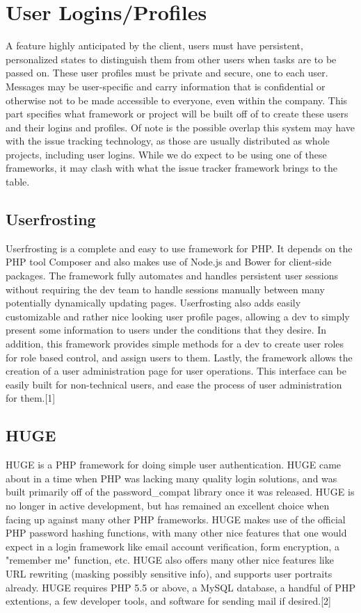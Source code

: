 \documentclass[onecolumn, draftclsnofoot,10pt, compsoc]{IEEEtran}
\begin{document}

\section{User Logins/Profiles}
A feature highly anticipated by the client, users must have persistent, personalized states to distinguish them from other users when tasks are to be 
passed on. These user profiles must be private and secure, one to each user. Messages may be user-specific and carry information that is confidential 
or otherwise not to be made accessible to everyone, even within the company. This part specifies what framework or project will be built off of to 
create these users and their logins and profiles. Of note is the possible overlap this system may have with the issue tracking technology, as those are 
usually distributed as whole projects, including user logins. While we do expect to be using one of these frameworks, it may clash with what the issue tracker 
framework brings to the table.
\subsection{Userfrosting}
Userfrosting is a complete and easy to use framework for PHP. It depends on the PHP tool Composer and also makes use of Node.js and Bower for client-side packages.
The framework fully automates and handles persistent user sessions without requiring the dev team to handle sessions manually between many potentially dynamically updating 
pages. Userfrosting also adds easily customizable and rather nice looking user profile pages, allowing a dev to simply present some information to users under the conditions 
that they desire. In addition, this framework provides simple methods for a dev to create user roles for role based control, and assign users to them. Lastly, the framework 
allows the creation of a user administration page for user operations. This interface can be easily built for non-technical users, and ease the process of user administration 
for them.[1]
\subsection{HUGE}
HUGE is a PHP framework for doing simple user authentication. HUGE came about in a time when PHP was lacking many quality login solutions, and was built
primarily off of the password\_compat library once it was released. HUGE is no longer in active development, but has remained an excellent choice when facing 
up against many other PHP frameworks. HUGE makes use of the official PHP password hashing functions, with many other nice features that one would expect in a 
login framework like email account verification, form encryption, a "remember me" function, etc. HUGE also offers many other nice features like URL rewriting 
(masking possibly sensitive info), and supports user portraits already. HUGE requires PHP 5.5 or above, a MySQL database, a handful of PHP extentions, a few 
developer tools, and software for sending mail if desired.[2]
\end{document}
